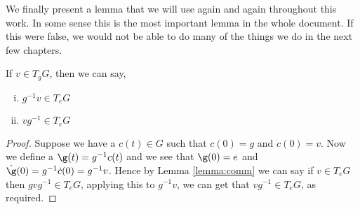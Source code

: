 \noindent
We finally present a lemma that we will use again and again throughout this work. In some sense this is the most important lemma in the whole document. If this were false, we would not be able to do many of the things we do in the next few chapters.
\begin{nlemma}
  If $v \in T_gG$, then we can say,
  \begin{enumerate}[(i)]
    \item $g^{-1}v \in T_eG$
    \item $vg^{-1} \in T_eG$
  \end{enumerate}
\end{nlemma}
{\begin{proof}
  Suppose we have a $c(t) \in G$ such that $c(0) = g$ and $\dot c(0) = v$. Now we define a $\g(t) = g^{-1}c(t)$ and we see that $\g (0) = e$ and $\dot\g(0) = g^{-1}\dot c(0) = g^{-1}v$. Hence by Lemma \ref{lemma:comm} we can say if $v \in T_eG$ then $gvg^{-1} \in T_eG$, applying this to $g^{-1}v$, we can get that $vg^{-1} \in T_eG$, as required.
\end{proof} }
